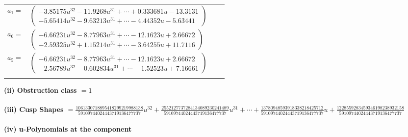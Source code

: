 \documentclass[1p]{elsarticle_modified}
\theoremstyle{definition}
\begin{document}
\begin{tabular}{m{7pt} m{180pt} m{7pt} m{180pt} }
\flushright $a_{1}=$&$\begin{pmatrix}-3.85175 u^{32}-11.9268 u^{31}+\cdots+0.333681 u-13.3131\\-5.65414 u^{32}-9.63213 u^{31}+\cdots-4.44352 u-5.63441\end{pmatrix}$ \\
\flushright $a_{6}=$&$\begin{pmatrix}-6.66231 u^{32}-8.77963 u^{31}+\cdots-12.1623 u+2.66672\\-2.59325 u^{32}+1.15214 u^{31}+\cdots-3.64255 u+11.7116\end{pmatrix}$ \\
\flushright $a_{5}=$&$\begin{pmatrix}-6.66231 u^{32}-8.77963 u^{31}+\cdots-12.1623 u+2.66672\\-2.56789 u^{32}-0.602834 u^{31}+\cdots-1.52523 u+7.16661\end{pmatrix}$\\&\end{tabular}
\flushleft \textbf{(ii) Obstruction class $= 1$}\\~\\
\flushleft \textbf{(iii) Cusp Shapes $= \frac{1061330718895418299219988138}{59109744024443719136477737} u^{32}+\frac{2552127737284134089230241489}{59109744024443719136477737} u^{31}+\cdots+\frac{13780948593918338218425712}{59109744024443719136477737} u+\frac{1228559283459346198238932158}{59109744024443719136477737}$}\\~\\
\newpage\renewcommand{\arraystretch}{1}
\flushleft \textbf{(iv) u-Polynomials at the component}\newline \\
\end{document}
